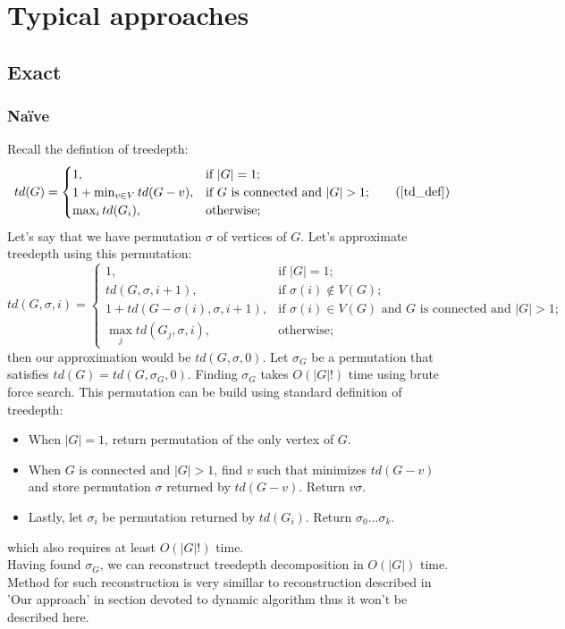 \section{Typical approaches}
\subsection{Exact}
\subsubsection{Na\"ive}
Recall the defintion of treedepth:
\begin{equation*}
td(G)={\begin{cases}1,&{\text{if }}|G|=1;\\1+\min _{{v\in V}}td(G-v),&{\text{if }}G{\text{ is connected and }}|G|>1;\\\max _{{i}}td(G_{i}),&{\text{otherwise}};\end{cases}}\tag{\ref{td_def}}
\end{equation*}
Let's say that we have permutation $\sigma$ of vertices of $G$. Let's approximate treedepth using this permutation:
\begin{equation}
td(G, \sigma, i)={
	\begin{cases}
	1,&{\text{if }}|G|=1;\\
	td(G, \sigma, i + 1), &{\text{if }}\sigma(i)\notin V(G);\\
	1+td(G-\sigma(i), \sigma, i+1),&{\text{if }}{\sigma(i)\in V(G)\text{ and }}G{\text{ is connected and }}|G|>1;\\
	\max _{{j}}td(G_{j}, \sigma, i),&{\text{otherwise}};
	\end{cases}
}
\label{td_def_paermutation}
\end{equation}
then our approximation would be $td(G, \sigma, 0)$. Let $\sigma_G$ be a permutation that satisfies $td(G) = td(G, \sigma_G, 0)$. Finding $\sigma_G$ takes $O\left(\left|G\right|!\right)$ time using brute force search. This permutation can be build using standard definition of treedepth:
\begin{itemize}
	\item When $\left|G\right| = 1$, return permutation of the only vertex of $G$.
	\item When $G{\text{ is connected and }}|G|>1$, find $v$ such that minimizes $td(G-v)$ and store permutation $\sigma$ returned by $td(G-v)$. Return $v\sigma$.
	\item Lastly, let $\sigma_i$ be permutation returned by $td(G_i)$. Return $\sigma_0...\sigma_k$.
\end{itemize}
which also requires at least $O\left(\left|G\right|!\right)$ time.\\
Having found $\sigma_G$, we can reconstruct treedepth decomposition in $O\left(\left|G\right|\right)$ time. Method for such reconstruction is very simillar to reconstruction described in 'Our approach' in section devoted to dynamic algorithm thus it won't be described here.
